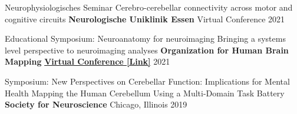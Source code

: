 \begin{cventries}

  \cventry
    {Neurophysiologisches Seminar} %
    {Cerebro-cerebellar connectivity across motor and cognitive circuits} %
    {\textbf{Neurologische Uniklinik Essen}} %
    {Virtual Conference} %
    {2021} %

  \cventry
    {Educational Symposium: Neuroanatomy for neuroimaging} %
    {Bringing a systems level perspective to neuroimaging analyses} %
    {\textbf{Organization for Human Brain Mapping}} %
    { \href{https://www.youtube.com/watch?v=L6nwkvBqJzI}{\textbf{Virtual Conference [Link]}}} %
    {2021} %
    

  \cventry
    {Symposium: New Perspectives on Cerebellar Function: Implications for Mental Health} %
    {Mapping the Human Cerebellum Using a Multi-Domain Task Battery} %
    {\textbf{Society for Neuroscience}} %
    {Chicago, Illinois} %
    {2019} %
    
    
   
\end{cventries}


